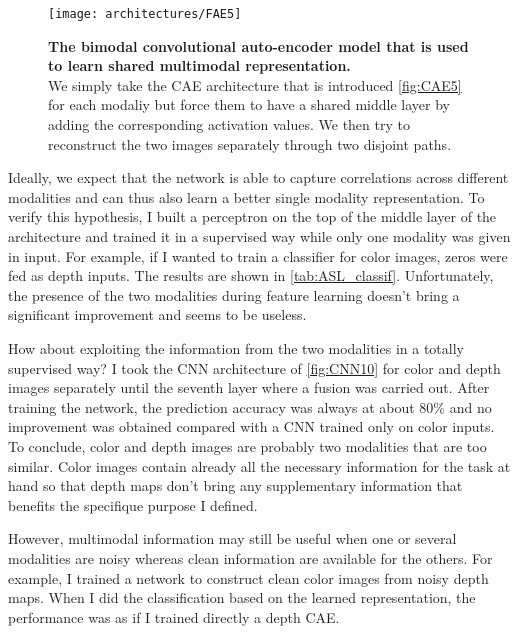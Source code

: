 \begin{figure}[H]
  \centering
  \texttt{[image: architectures/FAE5]}
  \caption{%
    \textbf{The bimodal convolutional auto-encoder model that is
      used to learn shared multimodal representation.}\\[0.1em]
    We simply take the CAE architecture that is introduced
      \autoref{fig:CAE5} for each modaliy but force them to have a
      shared middle layer by adding the corresponding activation values.
      We then try to reconstruct the two images separately through
      two disjoint paths.}
  \label{fig:FAE5}
\end{figure}

Ideally, we expect that the network is able to capture correlations
across different modalities and can thus also learn a better single
modality representation. To verify this hypothesis, I built a perceptron
on the top of the middle layer of the architecture and trained it
in a supervised way while only one modality was given in input. For example,
if I wanted to train a classifier for color images, zeros were fed as
depth inputs. The results are shown in \autoref{tab:ASL_classif}.
Unfortunately, the presence of the two modalities during feature
learning doesn't bring a significant improvement and seems to be useless.

How about exploiting the information from the two modalities in a
totally supervised way? I took the CNN architecture of \autoref{fig:CNN10}
for color and depth images separately until the seventh layer where
a fusion was carried out. After training the network, the prediction
accuracy was always at about 80\% and no improvement was obtained compared
with a CNN trained only on color inputs. To conclude, color and depth
images are probably two modalities that are too similar. Color images
contain already all the necessary information for the task at hand so
that depth maps don't bring any supplementary information that benefits
the specifique purpose I defined.

However, multimodal information may still be useful when one or several
modalities are noisy whereas clean information are available for the others.
For example, I trained a network to construct clean color images from
noisy depth maps. When I did the classification based on the learned
representation, the performance was as if I trained directly a depth CAE.

